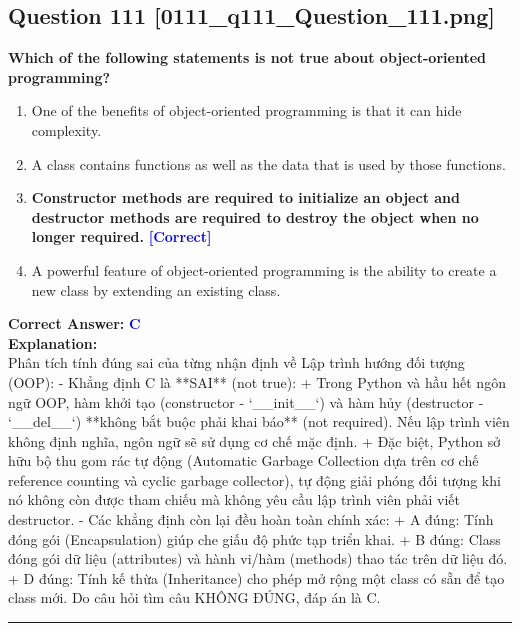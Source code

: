 \documentclass[11pt,a4paper]{article}
\begin{document}
\begin{minipage}{\textwidth}
\subsection*{Question 111 \quad \footnotesize{[0111_q111_Question_111.png]}}
\noindent \textbf{Which of the following statements is not true about object-oriented programming?}

\begin{enumerate}[label=\Alph*.]
    \item One of the benefits of object-oriented programming is that it can hide complexity.
    \item A class contains functions as well as the data that is used by those functions.
    \item \textbf{Constructor methods are required to initialize an object and destructor methods are required to destroy the object when no longer required.} \hfill \textcolor{blue}{\textbf{[Correct]}}
    \item A powerful feature of object-oriented programming is the ability to create a new class by extending an existing class.
\end{enumerate}

\noindent \textbf{Correct Answer:} \textcolor{blue}{\textbf{C}} \\[4pt]
\noindent \textbf{Explanation:}\\
Phân tích tính đúng sai của từng nhận định về Lập trình hướng đối tượng (OOP):\newline
- Khẳng định C là **SAI** (not true):\newline
  + Trong Python và hầu hết ngôn ngữ OOP, hàm khởi tạo (constructor - `__init__`) và hàm hủy (destructor - `__del__`) **không bắt buộc phải khai báo** (not required). Nếu lập trình viên không định nghĩa, ngôn ngữ sẽ sử dụng cơ chế mặc định.\newline
  + Đặc biệt, Python sở hữu bộ thu gom rác tự động (Automatic Garbage Collection dựa trên cơ chế reference counting và cyclic garbage collector), tự động giải phóng đối tượng khi nó không còn được tham chiếu mà không yêu cầu lập trình viên phải viết destructor.\newline
- Các khẳng định còn lại đều hoàn toàn chính xác:\newline
  + A đúng: Tính đóng gói (Encapsulation) giúp che giấu độ phức tạp triển khai.\newline
  + B đúng: Class đóng gói dữ liệu (attributes) và hành vi/hàm (methods) thao tác trên dữ liệu đó.\newline
  + D đúng: Tính kế thừa (Inheritance) cho phép mở rộng một class có sẵn để tạo class mới.\newline
Do câu hỏi tìm câu KHÔNG ĐÚNG, đáp án là C.
\end{minipage}
\vspace{0.8cm}
\hrule
\vspace{0.5cm}
\end{document}
